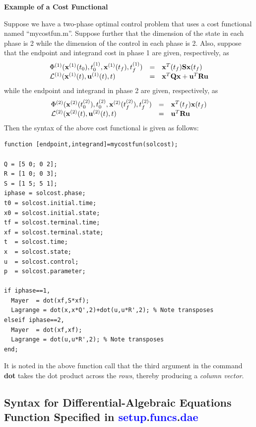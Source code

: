 \documentclass[10pt]{article}
\newenvironment{shadedframe}{%
  \def\FrameCommand{\fcolorbox{black}{shadecolor}}%
  \MakeFramed {\FrameRestore}}
{\endMakeFramed}
\newcommand{\bfblue}[1]{\textcolor{blue}{\bf #1}}
\begin{document}
\scriptsize
\begin{shadedframe}
{\noindent}{\bf Example of a Cost Functional}
\vspace{12pt}

Suppose we have a two-phase optimal control problem that uses a cost
functional named ``mycostfun.m''.  Suppose further that the dimension of the
state in each phase is 2 while the dimension of the control in each phase is
2.  Also, suppose that the endpoint and integrand cost in phase 1 are
given, respectively, as
\begin{displaymath}
  \begin{array}{lcl}
    \Phi^{(1)}(\mathbf{x}^{(1)}(t_0),t_0^{(1)},\mathbf{x}^{(1)}(t_f),t_f^{(1)}) & = & \mathbf{x}^T(t_f)\mathbf{S}\mathbf{x}(t_f) \\
    \mathcal{L}^{(1)}(\mathbf{x}^{(1)}(t),\mathbf{u}^{(1)}(t),t) & = & \mathbf{x}^T\mathbf{Q}\mathbf{x} + \mathbf{u}^T\mathbf{R}\mathbf{u}
  \end{array}
\end{displaymath}
while the endpoint and integrand in phase 2 are given, respectively, as
\begin{displaymath}
  \begin{array}{lcl}
    \Phi^{(2)}(\mathbf{x}^{(2)}(t_0^{(2)}),t_0^{(2)},\mathbf{x}^{(2)}(t_f^{(2)}),t_f^{(2)}) & = & \mathbf{x}^T(t_f)\mathbf{x}(t_f) \\
    \mathcal{L}^{(2)}(\mathbf{x}^{(2)}(t),\mathbf{u}^{(2)}(t),t) & = & \mathbf{u}^T\mathbf{R}\mathbf{u}
  \end{array}
\end{displaymath}
Then the syntax of the above cost functional is given as follows:
\begin{verbatim}
function [endpoint,integrand]=mycostfun(solcost);

Q = [5 0; 0 2];
R = [1 0; 0 3];
S = [1 5; 5 1];
iphase = solcost.phase;
t0 = solcost.initial.time;
x0 = solcost.initial.state;
tf = solcost.terminal.time;
xf = solcost.terminal.state;
t  = solcost.time;
x  = solcost.state;
u  = solcost.control;
p  = solcost.parameter;

if iphase==1,
  Mayer  = dot(xf,S*xf);
  Lagrange = dot(x,x*Q',2)+dot(u,u*R',2); % Note transposes
elseif iphase==2,
  Mayer  = dot(xf,xf);
  Lagrange = dot(u,u*R',2); % Note transposes
end;
\end{verbatim}
It is noted in the above function call that the third argument in the
command {\bf dot} takes the dot product across the {\em rows}, thereby
producing a {\em column vector}.
\end{shadedframe}
\normalsize

\subsection{Syntax for Differential-Algebraic Equations Function Specified in \bfblue{setup}.\bfblue{funcs}.\bfblue{dae} \label{sect:daeSyntax}}
\end{document}
